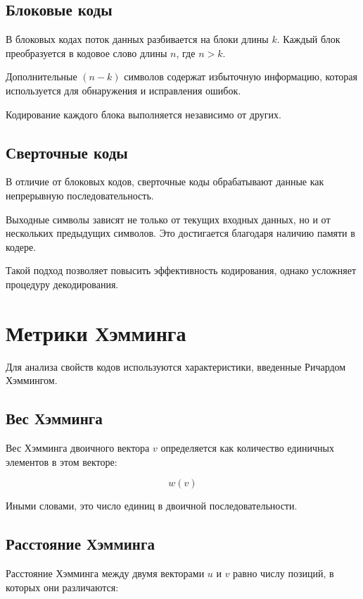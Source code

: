 \documentclass[a4paper,12pt]{article}
\begin{document}
\subsection{Блоковые коды}

В блоковых кодах поток данных разбивается на блоки длины $k$.
Каждый блок преобразуется в кодовое слово длины $n$, где $n > k$.

Дополнительные $(n-k)$ символов содержат избыточную информацию,
которая используется для обнаружения и исправления ошибок.

Кодирование каждого блока выполняется независимо от других.

\subsection{Сверточные коды}

В отличие от блоковых кодов, сверточные коды обрабатывают данные
как непрерывную последовательность.

Выходные символы зависят не только от текущих входных данных,
но и от нескольких предыдущих символов. Это достигается благодаря
наличию памяти в кодере.

Такой подход позволяет повысить эффективность кодирования,
однако усложняет процедуру декодирования.

\section{Метрики Хэмминга}

Для анализа свойств кодов используются характеристики,
введенные Ричардом Хэммингом.

\subsection{Вес Хэмминга}

Вес Хэмминга двоичного вектора $v$ определяется как количество
единичных элементов в этом векторе:

\[
w(v)
\]

Иными словами, это число единиц в двоичной последовательности.

\subsection{Расстояние Хэмминга}

Расстояние Хэмминга между двумя векторами $u$ и $v$
равно числу позиций, в которых они различаются:
\end{document}
